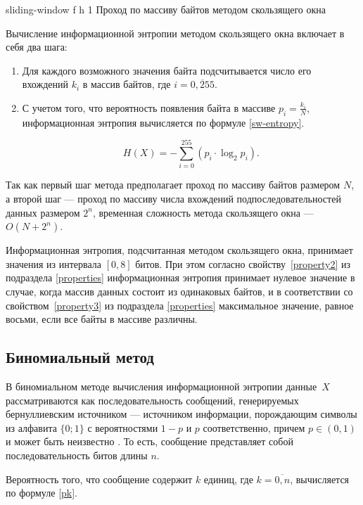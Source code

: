     {sliding-window}
    {f}
    {h}
    {1\textwidth}
    {Проход по массиву байтов методом скользящего окна}
    
Вычисление информационной энтропии методом скользящего окна включает в себя два шага:

\begin{enumerate}
	\item Для каждого возможного значения байта подсчитывается число его вхождений $k_{i}$ в массив байтов, где $i = \overline{0, 255}$.
	\item С учетом того, что вероятность появления байта в массиве $p_{i} = \frac{k_{i}}{N}$, информационная энтропия вычисляется по формуле \ref{sw-entropy}.
	
	\begin{equation}\label{sw-entropy}
		H(X) = -\sum_{i = 0}^{255} (p_{i} \cdot \log_{2}p_{i}).
	\end{equation}
\end{enumerate}

Так как первый шаг метода предполагает проход по массиву байтов размером $N$, а второй шаг --- проход по массиву числа вхождений подпоследовательностей данных размером $2^n$, временная сложность метода скользящего окна --- $O(N + 2^n)$. 

Информационная энтропия, подсчитанная методом скользящего окна, принимает значения из интервала $[0, 8]$ битов. При этом согласно свойству~\ref{property2} из подраздела \ref{properties} информационная энтропия принимает нулевое значение в случае, когда массив данных состоит из одинаковых байтов, и в соответствии со свойством~\ref{property3} из подраздела \ref{properties} максимальное значение, равное восьми, если все байты в массиве различны.

\subsection{Биномиальный метод}\label{binomial}

В биномиальном методе вычисления информационной энтропии \cite{binomial-method} данные~$X$ рассматриваются как последовательность сообщений, генерируемых бернуллиевским источником --- источником информации, порождающим символы из алфавита $\{0; 1\}$ с вероятностями $1 - p$ и $p$ соответственно, причем $p \in (0, 1)$ и может быть неизвестно \cite{bernullie-source}. То есть, сообщение представляет собой последовательность битов длины $n$.

Вероятность того, что сообщение содержит $k$ единиц, где $k = \overline{0, n}$, вычисляется по формуле \ref{pk}.

